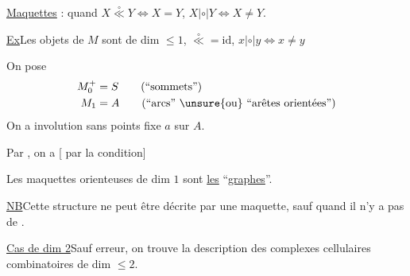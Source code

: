 \uline{Maquettes} \uline{} : quand $X\overset{\circ}{\ll}Y\Longleftrightarrow X=Y$, $X|\circ|Y\Longleftrightarrow X\ne Y$.

\uline{Ex}\quad Les objets de $M$ sont de dim $\leq1$, $\overset{\circ}{\ll}=\mathrm{id}$, $x|\circ|y\Longleftrightarrow x\ne y$


On pose
\[
\begin{aligned}
M_0^+&=S\qquad\text{(``sommets'')}\\
M_1&=A\qquad\text{(``arcs'' \unsure{ou} ``arêtes orientées'')}
\end{aligned}
\]
On a involution sans points fixe $a$ sur $A$.

 Par , on a
[ par la condition]

Les maquettes orienteuses de dim \inserted{$\leq$}$1$ sont \uline{les} ``\uline{graphes}''.

\uline{NB}\quad Cette structure ne peut être décrite par une maquette, sauf quand il n'y a pas de  .

\uline{Cas  de  dim 2}\quad Sauf erreur, on trouve la description des complexes cellulaires combinatoires de dim $\leq2$.
